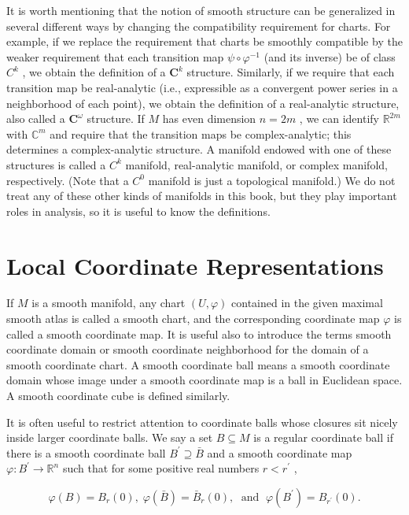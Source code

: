 \begin{remark}
\label{rem:1-2-extra-6}
\mathlibok
It is worth mentioning that the notion of smooth structure can be generalized in several different ways by changing the compatibility requirement for charts. For example, if we replace the requirement that charts be smoothly compatible by the weaker requirement that each transition map $\psi  \circ  {\varphi }^{-1}$ (and its inverse) be of class ${C}^{k}$ , we obtain the definition of a ${\mathbf{C}}^{k}$ structure. Similarly, if we require that each transition map be real-analytic (i.e., expressible as a convergent power series in a neighborhood of each point), we obtain the definition of a real-analytic structure, also called a ${\mathbf{C}}^{\omega }$ structure. If $M$ has even dimension $n = {2m}$ , we can identify ${\mathbb{R}}^{2m}$ with ${\mathbb{C}}^{m}$ and require that the transition maps be complex-analytic; this determines a complex-analytic structure. A manifold endowed with one of these structures is called a ${C}^{k}$ manifold, real-analytic manifold, or complex manifold, respectively. (Note that a ${C}^{0}$ manifold is just a topological manifold.) We do not treat any of these other kinds of manifolds in this book, but they play important roles in analysis, so it is useful to know the definitions.
\end{remark}


\section{Local Coordinate Representations}

\begin{definition}
\label{def:1-3-extra-1}
\leanok
If $M$ is a smooth manifold, any chart $\left( {U,\varphi }\right)$ contained in the given maximal smooth atlas is called a smooth chart, and the corresponding coordinate map $\varphi$ is called a smooth coordinate map. It is useful also to introduce the terms smooth coordinate domain or smooth coordinate neighborhood for the domain of a smooth coordinate chart. A smooth coordinate ball means a smooth coordinate domain whose image under a smooth coordinate map is a ball in Euclidean space. A smooth coordinate cube is defined similarly.

It is often useful to restrict attention to coordinate balls whose closures sit nicely inside larger coordinate balls. We say a set $B \subseteq  M$ is a regular coordinate ball if there is a smooth coordinate ball ${B}^{\prime } \supseteq  \bar{B}$ and a smooth coordinate map $\varphi  : {B}^{\prime } \rightarrow  {\mathbb{R}}^{n}$ such that for some positive real numbers $r < {r}^{\prime }$ ,

\[
\varphi \left( B\right)  = {B}_{r}\left( 0\right) ,\;\varphi \left( \bar{B}\right)  = {\bar{B}}_{r}\left( 0\right) ,\;\text{ and }\;\varphi \left( {B}^{\prime }\right)  = {B}_{{r}^{\prime }}\left( 0\right) .
\]
\end{definition}

